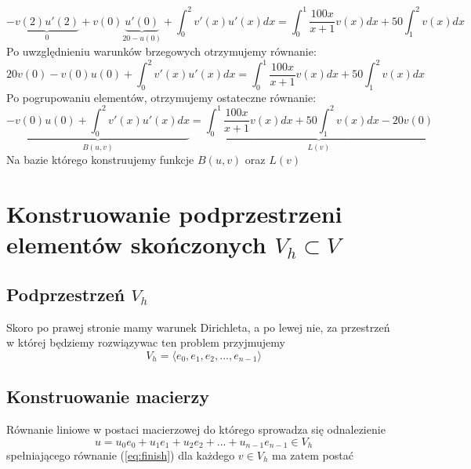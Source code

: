 \documentclass[12pt]{article}
\begin{document}
\begin{equation}
    - \underbrace{v(2)u'(2)}_0
    + v(0)\underbrace{u'(0)}_{20 - u(0)}
    + \int_0^2 v'(x) u'(x) dx
    = \int_{0}^{1} \frac{100x}{x+1} v(x) dx
    + 50\int_{1}^{2} v(x) dx
\end{equation}
% 
Po uwzględnieniu warunków brzegowych otrzymujemy równanie:
\begin{equation} \label{eq:finish}
    20v(0)
    - v(0)u(0)    
    + \int_0^2 v'(x) u'(x) dx
    = 
    \int_{0}^{1} \frac{100x}{x+1} v(x) dx
    + 50\int_{1}^{2} v(x) dx
\end{equation}
% 
Po pogrupowaniu elementów, otrzymujemy ostateczne równanie:
\begin{equation} \label{eq:finish}
    \underbrace{
        - v(0)u(0)    
        + \int_0^2 v'(x) u'(x) dx
    }_{B(u,v)}
    = 
    \underbrace{
        \int_{0}^{1} \frac{100x}{x+1} v(x) dx
        + 50\int_{1}^{2} v(x) dx
        - 20v(0)
    }_{L(v)}
\end{equation}
Na bazie którego konstruujemy funkcje $B(u,v)$ oraz $L(v)$
\section{Konstruowanie podprzestrzeni elementów skończonych $V_h \subset V$}
\subsection{Podprzestrzeń $V_h$}
Skoro po prawej stronie mamy warunek Dirichleta, a po lewej nie, za przestrzeń w której będziemy rozwiązywac ten problem przyjmujemy
\begin{equation}
    V_h = \langle e_0, e_1, e_2, ..., e_{n-1}\rangle
\end{equation}
% 
\subsection{Konstruowanie macierzy}
Równanie liniowe w postaci macierzowej do którego sprowadza się odnalezienie
\begin{equation}
    u = u_0e_0 + u_1e_1 + u_2e_2 + ... + u_{n-1}e_{n-1} \in V_h
\end{equation}
% 
spełniającego równanie (\ref{eq:finish}) dla każdego $v \in V_h$ ma zatem postać
\end{document}
